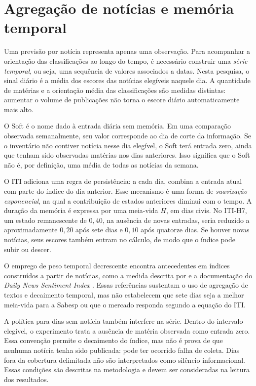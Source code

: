 \section{Agregação de notícias e memória temporal}

Uma previsão por notícia representa apenas uma observação. Para acompanhar a orientação das classificações ao longo do tempo, é necessário construir uma \emph{série temporal}, ou seja, uma sequência de valores associados a datas. Nesta pesquisa, o sinal diário é a média dos escores das notícias elegíveis naquele dia. A quantidade de matérias e a orientação média das classificações são medidas distintas: aumentar o volume de publicações não torna o escore diário automaticamente mais alto.

O Soft é o nome dado à entrada diária sem memória. Em uma comparação observada semanalmente, seu valor corresponde ao dia de corte da informação. Se o inventário não contiver notícia nesse dia elegível, o Soft terá entrada zero, ainda que tenham sido observadas matérias nos dias anteriores. Isso significa que o Soft não é, por definição, uma média de todas as notícias da semana.

O ITI adiciona uma regra de persistência: a cada dia, combina a entrada atual com parte do índice do dia anterior. Esse mecanismo é uma forma de \emph{suavização exponencial}, na qual a contribuição de estados anteriores diminui com o tempo. A duração da memória é expressa por uma meia-vida $H$, em dias civis. No ITI-H7, um estado remanescente de $0{,}40$, na ausência de novas entradas, seria reduzido a aproximadamente $0{,}20$ após sete dias e $0{,}10$ após quatorze dias. Se houver novas notícias, seus escores também entram no cálculo, de modo que o índice pode subir ou descer.

O emprego de peso temporal decrescente encontra antecedentes em índices construídos a partir de notícias, como a medida descrita por  e a documentação do \emph{Daily News Sentiment Index} \cite{frbsfNewsSentiment,buckman2020dnsi}. Essas referências sustentam o uso de agregação de textos e decaimento temporal, mas não estabelecem que sete dias seja a melhor meia-vida para a Sabesp ou que o mercado responda segundo a equação do ITI.

A política para dias sem notícia também interfere na série. Dentro do intervalo elegível, o experimento trata a ausência de matéria observada como entrada zero. Essa convenção permite o decaimento do índice, mas não é prova de que nenhuma notícia tenha sido publicada: pode ter ocorrido falha de coleta. Dias fora da cobertura delimitada não são interpretados como silêncio informacional. Essas condições são descritas na metodologia e devem ser consideradas na leitura dos resultados.

